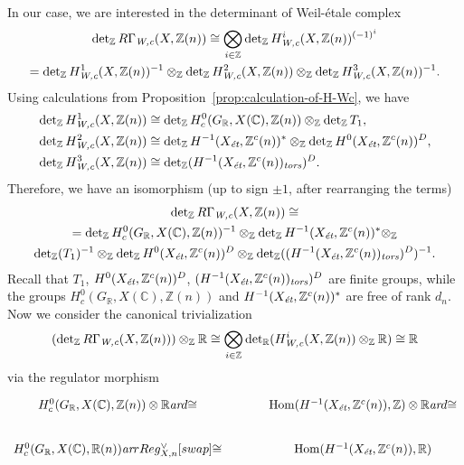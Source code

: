 \documentclass[draft]{article}
\DeclareMathOperator{\Hom}{Hom}
\newcommand{\CC}{\mathbb{C}}
\newcommand{\RR}{\mathbb{R}}
\newcommand{\ZZ}{\mathbb{Z}}
\renewcommand{\det}{\operatorname{det}}
\newcommand{\ar}{\text{\it ar}}
\newcommand{\et}{\text{\it \'{e}t}}
\newcommand{\tors}{\text{\it tors}}
\newcommand{\Wc}{\text{\it W,c}}
\theoremstyle{myplain}
\theoremstyle{mydefinition}
\numberwithin{equation}{section}
\begin{document}
In our case, we are interested in the determinant of Weil-\'{e}tale complex
\begin{multline*}
  \det_\ZZ R\Gamma_\Wc (X, \ZZ(n)) \cong
  \bigotimes_{i \in \ZZ} \det_\ZZ H^i_\Wc (X, \ZZ(n))^{(-1)^i} \\
  =
  \det_\ZZ H^1_\Wc (X, \ZZ(n))^{-1} \otimes_\ZZ
  \det_\ZZ H^2_\Wc (X, \ZZ(n)) \otimes_\ZZ
  \det_\ZZ H^3_\Wc (X, \ZZ(n))^{-1}.
\end{multline*}
Using calculations from Proposition~\ref{prop:calculation-of-H-Wc}, we have
\begin{align*}
  \det_\ZZ H^1_\Wc (X, \ZZ(n)) & \cong \det_\ZZ H^0_c (G_\RR, X(\CC), \ZZ(n)) \otimes_\ZZ \det_\ZZ T_1, \\
  \det_\ZZ H^2_\Wc (X, \ZZ(n)) & \cong \det_\ZZ H^{-1} (X_\et, \ZZ^c(n))^* \otimes_\ZZ \det_\ZZ H^0 (X_\et, \ZZ^c(n))^D, \\
  \det_\ZZ H^3_\Wc (X, \ZZ(n)) & \cong \det_\ZZ (H^{-1} (X_\et, \ZZ^c(n))_\tors)^D.
\end{align*}
Therefore, we have an isomorphism (up to sign $\pm 1$, after rearranging the
terms)
\begin{multline*}
  \det_\ZZ R\Gamma_\Wc (X, \ZZ(n)) \cong \\
  =
  \det_\ZZ H^0_c (G_\RR, X(\CC), \ZZ(n))^{-1} \otimes_\ZZ
  \det_\ZZ H^{-1} (X_\et, \ZZ^c(n))^* \otimes_\ZZ \\
  \det_\ZZ (T_1)^{-1} \otimes_\ZZ  \det_\ZZ H^0 (X_\et, \ZZ^c(n))^D \otimes_\ZZ \det_\ZZ ((H^{-1} (X_\et, \ZZ^c(n))_\tors)^D)^{-1}.
\end{multline*}
Recall that $T_1$, $H^0 (X_\et, \ZZ^c(n))^D$,
$(H^{-1} (X_\et, \ZZ^c(n))_\tors)^D$ are finite groups, while the groups
$H^0_c (G_\RR, X(\CC), \ZZ(n))$ and $H^{-1} (X_\et, \ZZ^c(n))^*$ are free of
rank $d_n$. Now we consider the canonical trivialization
\[ (\det_\ZZ R\Gamma_\Wc (X, \ZZ(n))) \otimes_\ZZ \RR \cong
  \bigotimes_{i\in \ZZ} \det_\RR (H^i_\Wc (X, \ZZ(n))\otimes_\ZZ \RR)
  \cong \RR \]
via the regulator morphism
\[ \begin{tikzcd}[column sep=3em]
    H^0_c (G_\RR, X(\CC), \ZZ(n)) \otimes \RR\ar{d}{\cong} & \Hom (H^{-1} (X_\et, \ZZ^c (n)), \ZZ) \otimes \RR\ar{d}{\cong} \\
    H^0_c (G_\RR, X(\CC), \RR (n)) \ar{r}{Reg^\vee_{X,n}}[swap]{\cong} & \Hom (H^{-1} (X_\et, \ZZ^c (n)), \RR)
  \end{tikzcd} \]
\end{document}
